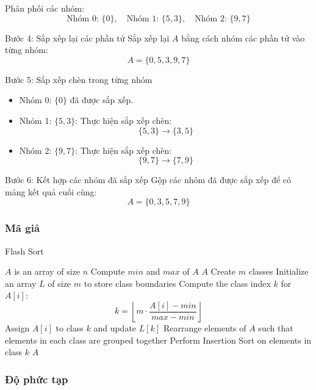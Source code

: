 Phân phối các nhóm:
\[
\text{Nhóm 0: } \{0\}, \quad \text{Nhóm 1: } \{5, 3\}, \quad \text{Nhóm 2: } \{9, 7\}
\]

Bước 4: Sắp xếp lại các phần tử
Sắp xếp lại \( A \) bằng cách nhóm các phần tử vào từng nhóm:
\[
A = \{0, 5, 3, 9, 7\}
\]

Bước 5: Sắp xếp chèn trong từng nhóm
\begin{itemize}
    \item Nhóm 0: \(\{0\}\) đã được sắp xếp.  
    \item Nhóm 1: \(\{5, 3\}\):  
  Thực hiện sắp xếp chèn:
  \[
  \{5, 3\} \to \{3, 5\}
  \]
    \item Nhóm 2: \(\{9, 7\}\):  
  Thực hiện sắp xếp chèn:
  \[
  \{9, 7\} \to \{7, 9\}
  \]
\end{itemize}

Bước 6: Kết hợp các nhóm đã sắp xếp
Gộp các nhóm đã được sắp xếp để có mảng kết quả cuối cùng:
\[
A = \{0, 3, 5, 7, 9\}
\]


\subsubsection{Mã giả}


 
\begin{algorithm}[H]
\caption{Flash Sort}
\label{alg:flash-sort}
\begin{algorithmic}


\Require $A$ is an array of size $n$
    \State Compute $min$ and $max$ of $A$
        \State \Return $A$ 
    \EndIf
    \State Create $m$ classes \Comment{Typically $m = \alpha \cdot n$ where $\alpha \in (0, 1]$ is a constant}
    \State Initialize an array $L$ of size $m$ to store class boundaries
        \State Compute the class index $k$ for $A[i]$:
       $$k = \left\lfloor m \cdot \frac{A[i] - min}{max - min} \right\rfloor$$
        \State Assign $A[i]$ to class $k$ and update $L[k]$
    \EndFor
    \State Rearrange elements of $A$ such that elements in each class are grouped together
        \State Perform Insertion Sort on elements in class $k$
    \EndFor
    \State \Return $A$
\EndFunction


\end{algorithmic}
\end{algorithm}


\subsubsection{Độ phức tạp}


